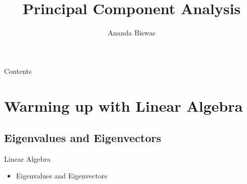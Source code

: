 \documentclass[10pt, aspectratio=169]{beamer}
\title{Principal Component Analysis}
\author{Ananda Biswas}
\date{}
\begin{document}
\begin{frame}
	\titlepage
\end{frame}

\begin{frame}{Contents}
    \tableofcontents
\end{frame}


\section{Warming up with Linear Algebra}

\subsection{Eigenvalues and Eigenvectors}
\begin{frame}{Linear Algebra}
    \begin{itemize}
        \item Eigenvalues and Eigenvectors
    \end{itemize}
\end{frame}
\end{document}
